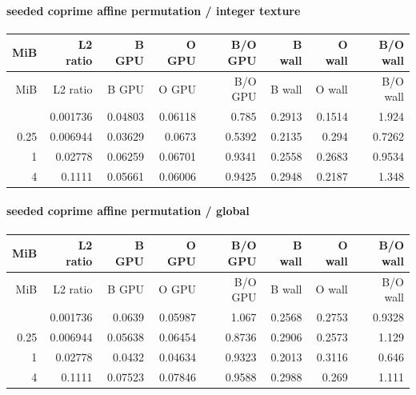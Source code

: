 \paragraph{seeded coprime affine permutation / integer texture}

\begingroup
\scriptsize
\setlength{\tabcolsep}{2.5pt}
\renewcommand{\arraystretch}{1.16}
\begin{longtable}{rrrrrrrr}
\toprule
MiB & L2 ratio & B GPU & O GPU & B/O GPU & B wall & O wall & B/O wall \\
\midrule\endfirsthead
\toprule
MiB & L2 ratio & B GPU & O GPU & B/O GPU & B wall & O wall & B/O wall \\
\midrule\endhead
\bottomrule\endfoot
0.0625 & 0.001736 & 0.04803 & 0.06118 & 0.785 & 0.2913 & 0.1514 & 1.924 \\
0.25 & 0.006944 & 0.03629 & 0.0673 & 0.5392 & 0.2135 & 0.294 & 0.7262 \\
1 & 0.02778 & 0.06259 & 0.06701 & 0.9341 & 0.2558 & 0.2683 & 0.9534 \\
4 & 0.1111 & 0.05661 & 0.06006 & 0.9425 & 0.2948 & 0.2187 & 1.348 \\
\end{longtable}
\endgroup


\paragraph{seeded coprime affine permutation / global}

\begingroup
\scriptsize
\setlength{\tabcolsep}{2.5pt}
\renewcommand{\arraystretch}{1.16}
\begin{longtable}{rrrrrrrr}
\toprule
MiB & L2 ratio & B GPU & O GPU & B/O GPU & B wall & O wall & B/O wall \\
\midrule\endfirsthead
\toprule
MiB & L2 ratio & B GPU & O GPU & B/O GPU & B wall & O wall & B/O wall \\
\midrule\endhead
\bottomrule\endfoot
0.0625 & 0.001736 & 0.0639 & 0.05987 & 1.067 & 0.2568 & 0.2753 & 0.9328 \\
0.25 & 0.006944 & 0.05638 & 0.06454 & 0.8736 & 0.2906 & 0.2573 & 1.129 \\
1 & 0.02778 & 0.0432 & 0.04634 & 0.9323 & 0.2013 & 0.3116 & 0.646 \\
4 & 0.1111 & 0.07523 & 0.07846 & 0.9588 & 0.2988 & 0.269 & 1.111 \\
\end{longtable}
\endgroup

